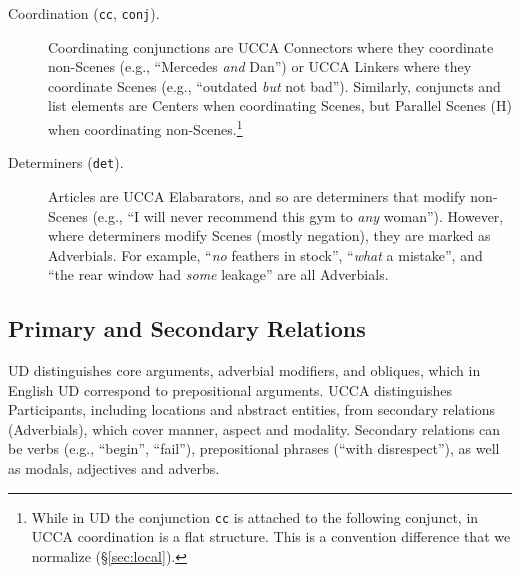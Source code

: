 \documentclass[11pt,a4paper]{article}
\begin{document}
\begin{description}
    

    \item[Coordination (\texttt{cc}, \texttt{conj}).]
      Coordinating conjunctions are UCCA Connectors where they coordinate non-Scenes
      (e.g., ``Mercedes \textit{and} Dan'')
      or UCCA Linkers where they coordinate Scenes (e.g., ``outdated \textit{but} not bad'').
      Similarly, conjuncts and list elements are Centers when coordinating Scenes,
      but Parallel Scenes (H) when coordinating non-Scenes.\footnote{While in UD 
      the conjunction \texttt{cc} is attached to the following conjunct,
      in UCCA coordination is a flat structure.
      This is a convention difference that we normalize (\S\ref{sec:local}).}

    \item [Determiners (\texttt{det}).]
      Articles are UCCA Elabarators, and so are determiners that modify non-Scenes 
      (e.g., ``I will never recommend this gym to \textit{any} woman'').
      However, where determiners modify Scenes (mostly negation),
      they are marked as Adverbials. For example, ``\textit{no} feathers in stock'', ``\textit{what} a mistake'',
      and ``the rear window had \textit{some} leakage'' are all Adverbials.

\end{description}



\subsection{Primary and Secondary Relations}\label{sec:arguments}

UD distinguishes core arguments, adverbial modifiers,
and obliques, which in English UD correspond to prepositional arguments.
UCCA distinguishes Participants, including locations and abstract entities,
from secondary relations (Adverbials), 
which cover manner, aspect and modality.
Secondary relations can be verbs (e.g., ``begin'', ``fail''),
prepositional phrases (``with disrespect''),
as well as modals, adjectives and adverbs.
\end{document}
